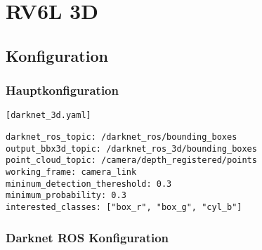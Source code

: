 
\newpage\section{RV6L 3D} \label{sec:rv6l_3d}

\subsection{Konfiguration} \label{subsec:bounding_config}

\subsubsection{Hauptkonfiguration}

\lstinline{[darknet_3d.yaml]}

\begin{lstlisting}
darknet_ros_topic: /darknet_ros/bounding_boxes
output_bbx3d_topic: /darknet_ros_3d/bounding_boxes
point_cloud_topic: /camera/depth_registered/points
working_frame: camera_link
mininum_detection_thereshold: 0.3
minimum_probability: 0.3
interested_classes: ["box_r", "box_g", "cyl_b"]
\end{lstlisting}


\subsubsection{Darknet ROS Konfiguration} \label{subsec:darknet_rosconfig}


